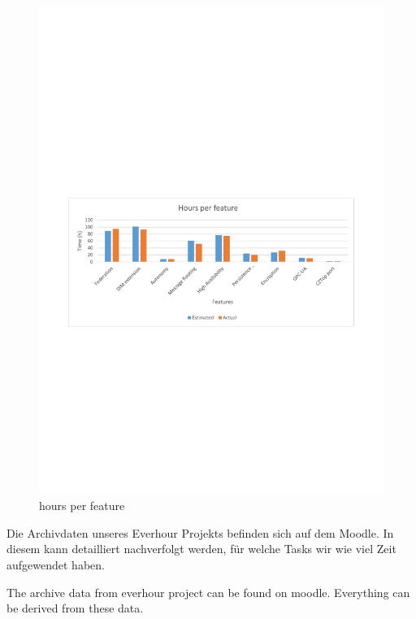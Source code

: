 \begin{figure}[]
	\includegraphics[trim=2cm 10.5cm 2cm 11.9cm, clip=true, width=\textwidth]{img/project_monitoring_hours_per_feature_diagram.pdf}
	\caption{hours per feature}
	\label{fig:hours:per:feature}
\end{figure}


Die Archivdaten unseres Everhour Projekts befinden sich auf dem Moodle. 
In diesem kann detailliert nachverfolgt werden, 
für welche Tasks wir wie viel Zeit aufgewendet haben.

The archive data from everhour project can be found on moodle. Everything can be derived from these data.

